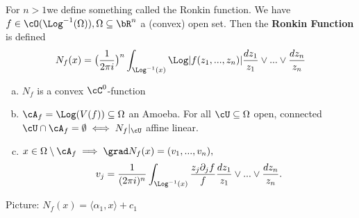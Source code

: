 For $n> 1$we define something called the Ronkin function. We have $f \in \cO(\Log^{-1}(\Omega)), \Omega \subseteq \bR^n$ a (convex) open set. Then the \textbf{Ronkin Function} is defined
\begin{align*}
  N_f(x) = \big(\frac{1}{2\pi i}\big)^n \int_{\Log^{-1}(x)} \Log |f(z_1,...,z_n)|\frac{dz_1}{z_1}\vee ... \vee \frac{dz_n}{z_n}
\end{align*}

\begin{thm}\label{thm:ronkin-function-thm}
\begin{enumerate}[(a)]
  \item $N_f$ is a convex $\cC^0$-function
  \item $\cA_f = \Log(V(f)) \subseteq \Omega$ an Amoeba. For all $\cU \subseteq \Omega$ open, connected $\cU \cap \cA_f = \emptyset \iff N_f|_{\cU}$ affine linear.
  \item $x \in \Omega \setminus \cA_f \implies \grad N_f(x) = (v_1,...,v_n),$ 
    \begin{align*}
      v_j = \frac{1}{(2\pi i)^n} \int_{\Log^{-1}(x)} \frac{z_j\partial_jf}{f}\frac{dz_1}{z_1}\vee...\vee \frac{dz_n}{z_n}.
    \end{align*}
\end{enumerate}
\end{thm}
Picture: $N_f(x) = \langle \alpha_1,x \rangle + c_1$
